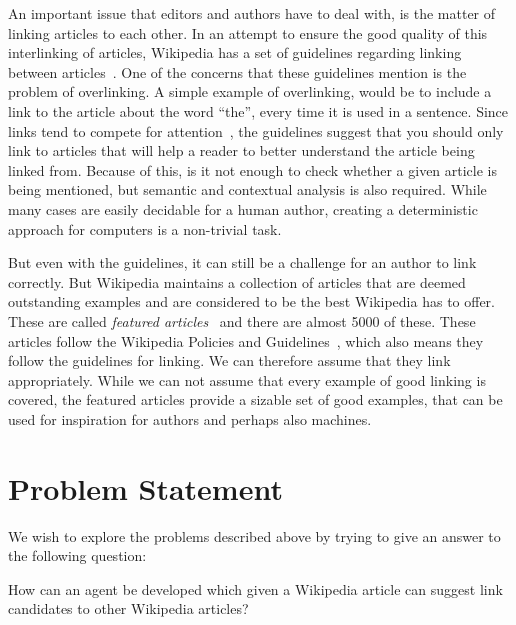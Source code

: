 An important issue that editors and authors have to deal with, is the matter of linking articles to each other. In an attempt to ensure the good quality of this interlinking of articles, Wikipedia has a set of guidelines regarding linking between articles~\cite{wiki-manual-of-style-overlinking}. 
One of the concerns that these guidelines mention is the problem of overlinking. A simple example of overlinking, would be to include a link to the article about the word \enquote{the}, every time it is used in a sentence. Since links tend to compete for attention~\cite{hyperlink-structure-using-logs}, the guidelines suggest that you should only link to articles that will help a reader to better understand the article being linked from. Because of this, is it not enough to check whether a given article is being mentioned, but semantic and contextual analysis is also required. While many cases are easily decidable for a human author, creating a deterministic approach for computers is a non-trivial task.

But even with the guidelines, it can still be a challenge for an author to link correctly. But Wikipedia maintains a collection of articles that are deemed outstanding examples and are considered to be the best Wikipedia has to offer. These are called \emph{featured articles}~\cite{wiki-featured-articles} and there are almost 5000 of these. These articles follow the Wikipedia Policies and Guidelines~\cite{wiki-editor-guidelines}, which also means they follow the guidelines for linking. We can therefore assume that they link appropriately. While we can not assume that every example of good linking is covered, the featured articles provide a sizable set of good examples, that can be used for inspiration for authors and perhaps also machines.

\section{Problem Statement}
\label{sec:problem_statement}
We wish to explore the problems described above by trying to give an answer to the following question:

\begin{formal}
How can an agent be developed which given a Wikipedia article can suggest link candidates to other Wikipedia articles?
\end{formal}

